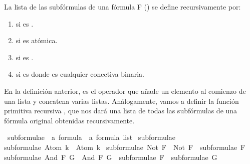 \begin{isabellebody}
\begin{isamarkuptext}
  \begin{definicion}
La lista de las subfórmulas de una fórmula F () se define recursivamente por:
    \begin{enumerate}
      \item \isa{{\isacharbrackleft}{\isasymbottom}{\isacharbrackright}} si  es \isa{{\isasymbottom}}.
      \item {} si  es atómica.
      \item {} si  es .
      \item {} si  es  donde \isa{{\isacharasterisk}} es cualquier conectiva binaria.
    \end{enumerate}
  \end{definicion}%
\end{isamarkuptext}\isamarkuptrue%
%
\begin{isamarkuptext}%
En la definición anterior, \isa{{\isacharhash}} es el operador que añade un elemento al comienzo de una lista
y \isa{{\isacharat}} concatena varias listas.
Análogamente, vamos a definir la función primitiva recursiva , que nos dará
una lista de todas las subfórmulas de una fórmula original obtenidas recursivamente.%
\end{isamarkuptext}\isamarkuptrue%
\isamarkupfalse%
\ subformulae\ {\isacharcolon}{\isacharcolon}\ {\isachardoublequoteopen}{\isacharprime}a\ formula\ {\isasymRightarrow}\ {\isacharprime}a\ formula\ list{\isachardoublequoteclose}\ \isanewline
{\isachardoublequoteopen}subformulae\ {\isasymbottom}\ {\isacharequal}\ {\isacharbrackleft}{\isasymbottom}{\isacharbrackright}{\isachardoublequoteclose}\ {\isacharbar}\isanewline
{\isachardoublequoteopen}subformulae\ {\isacharparenleft}Atom\ k{\isacharparenright}\ {\isacharequal}\ {\isacharbrackleft}Atom\ k{\isacharbrackright}{\isachardoublequoteclose}\ {\isacharbar}\isanewline
{\isachardoublequoteopen}subformulae\ {\isacharparenleft}Not\ F{\isacharparenright}\ {\isacharequal}\ Not\ F\ {\isacharhash}\ subformulae\ F{\isachardoublequoteclose}\ {\isacharbar}\isanewline
{\isachardoublequoteopen}subformulae\ {\isacharparenleft}And\ F\ G{\isacharparenright}\ {\isacharequal}\ And\ F\ G\ {\isacharhash}\ subformulae\ F\ {\isacharat}\ subformulae\ G{\isachardoublequoteclose}\ {\isacharbar}\isanewline

\end{isabellebody}
